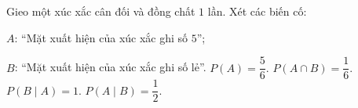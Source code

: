\begin{ex}
Gieo một xúc xắc cân đối và đồng chất $1$ lần. Xét các biến cố:

$A$: ``Mặt xuất hiện của xúc xắc ghi số $5$'';

$B$: ``Mặt xuất hiện của xúc xắc ghi số lẻ''.
\choiceTF
{$P(A)=\dfrac56$.}
{$P(A\cap B)=\dfrac16$.}
{$P(B\mid A)=1$.}
{$P(A\mid B)=\dfrac12$.}
\end{ex}
